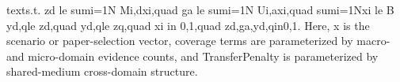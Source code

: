 {}\markdownRendererDollarSign{}\markdownRendererDollarSign{}\markdownRendererSoftLineBreak
{}\markdownRendererDollarSign{}\markdownRendererDollarSign{}\markdownRendererSoftLineBreak
{}\markdownRendererBackslash{}text\markdownRendererLeftBrace{}s.t. \markdownRendererRightBrace{} z\markdownRendererUnderscore{}d \markdownRendererBackslash{}le \markdownRendererBackslash{}sum\markdownRendererUnderscore{}\markdownRendererLeftBrace{}i=1\markdownRendererRightBrace{}\markdownRendererCircumflex{}\markdownRendererLeftBrace{}N\markdownRendererRightBrace{} M\markdownRendererUnderscore{}\markdownRendererLeftBrace{}i,d\markdownRendererRightBrace{}x\markdownRendererUnderscore{}i,\markdownRendererBackslash{}quad g\markdownRendererUnderscore{}a \markdownRendererBackslash{}le \markdownRendererBackslash{}sum\markdownRendererUnderscore{}\markdownRendererLeftBrace{}i=1\markdownRendererRightBrace{}\markdownRendererCircumflex{}\markdownRendererLeftBrace{}N\markdownRendererRightBrace{} U\markdownRendererUnderscore{}\markdownRendererLeftBrace{}i,a\markdownRendererRightBrace{}x\markdownRendererUnderscore{}i,\markdownRendererBackslash{}quad \markdownRendererBackslash{}sum\markdownRendererUnderscore{}\markdownRendererLeftBrace{}i=1\markdownRendererRightBrace{}\markdownRendererCircumflex{}\markdownRendererLeftBrace{}N\markdownRendererRightBrace{}x\markdownRendererUnderscore{}i \markdownRendererBackslash{}le B\markdownRendererSoftLineBreak
{}\markdownRendererDollarSign{}\markdownRendererDollarSign{}\markdownRendererSoftLineBreak
{}\markdownRendererDollarSign{}\markdownRendererDollarSign{}\markdownRendererSoftLineBreak
{}y\markdownRendererUnderscore{}\markdownRendererLeftBrace{}d,q\markdownRendererRightBrace{}\markdownRendererBackslash{}le z\markdownRendererUnderscore{}d,\markdownRendererBackslash{}quad y\markdownRendererUnderscore{}\markdownRendererLeftBrace{}d,q\markdownRendererRightBrace{}\markdownRendererBackslash{}le z\markdownRendererUnderscore{}q,\markdownRendererBackslash{}quad x\markdownRendererUnderscore{}i \markdownRendererBackslash{}in \markdownRendererLeftBrace{}0,1\markdownRendererRightBrace{},\markdownRendererBackslash{}quad z\markdownRendererUnderscore{}d,g\markdownRendererUnderscore{}a,y\markdownRendererUnderscore{}\markdownRendererLeftBrace{}d,q\markdownRendererRightBrace{}\markdownRendererBackslash{}in\markdownRendererLeftBrace{}0,1\markdownRendererRightBrace{}.\markdownRendererSoftLineBreak
{}\markdownRendererDollarSign{}\markdownRendererDollarSign{}\markdownRendererParagraphSeparator
{}Here, x is the scenario or paper-selection vector, coverage terms are parameterized by macro- and micro-domain evidence counts, and TransferPenalty is parameterized by shared-medium cross-domain structure.\markdownRendererParagraphSeparator
